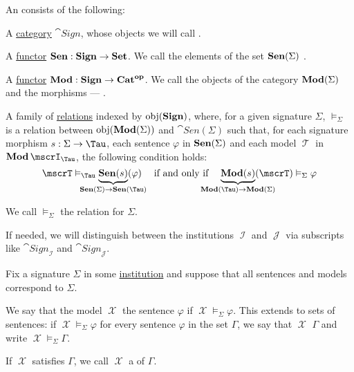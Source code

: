 \begin{definition}\label{def:institution}
  An  consists of the following:
  \begin{thmenum}
     A \hyperref[def:category]{category} \( \cat{Sign} \), whose objects we will call .

     A \hyperref[def:functor]{functor} \( \op*{Sen}: \cat{Sign} \to \cat{Set} \). We call the elements of the set \( \op*{Sen}(\Sigma) \) .

     A \hyperref[def:functor]{functor} \( \cat{Mod}: \cat{Sign} \to \cat{Cat}^{\oppos} \). We call the objects of the category \( \op*{Mod}(\Sigma) \)  and the morphisms --- .

     A family of \hyperref[def:relation]{relations} indexed by \( \obj(\cat{Sign}) \), where, for a given signature \( \Sigma \), \( \vDash_\Sigma \) is a relation between \( \obj(\op*{Mod}(\Sigma)) \) and \( \cat{Sen}(\Sigma) \) such that, for each signature morphism \( s: \Sigma \to \Tau \), each sentence \( \varphi \) in \( \op*{Sen}(\Sigma) \) and each model \( \mscrT \) in \( \op*{Mod}\mscrI_\Tau \), the following condition holds:
    \begin{equation}\label{eq:def:institution/satisfaction}
      \mscrT \vDash_\Tau \underbrace{\op*{Sen}(s)}_{\mathclap{\op*{Sen}(\Sigma) \to \op*{Sen}(\Tau)}}(\varphi)
      \quad\T{if and only if}\quad
      \underbrace{\op*{Mod}(s)}_{\mathclap{\op*{Mod}(\Tau) \to \op*{Mod}(\Sigma)}}(\mscrT) \vDash_\Sigma \varphi
    \end{equation}

    We call \( \vDash_\Sigma \) the  relation for \( \Sigma \).
  \end{thmenum}
\end{definition}
\begin{comments}
  \item If needed, we will distinguish between the institutions \( \mscrI \) and \( \mscrJ \) via subscripts like \( \cat{Sign}_\mscrI \) and \( \cat{Sign}_\mscrJ \).
\end{comments}

\begin{definition}\label{def:institutional_satisfaction}
  Fix a signature \( \Sigma \) in some \hyperref[def:institution]{institution} and suppose that all sentences and models correspond to \( \Sigma \).

  We say that the model \( \mscrX \)  the sentence \( \varphi \) if \( \mscrX \vDash_\Sigma \varphi \). This extends to sets of sentences: if \( \mscrX \vDash_\Sigma \varphi \) for every sentence \( \varphi \) in the set \( \Gamma \), we say that \( \mscrX \)  \( \Gamma \) and write \( \mscrX \vDash_\Sigma \Gamma \).

  If \( \mscrX \) satisfies \( \Gamma \), we call \( \mscrX \) a  of \( \Gamma \).
\end{definition}

